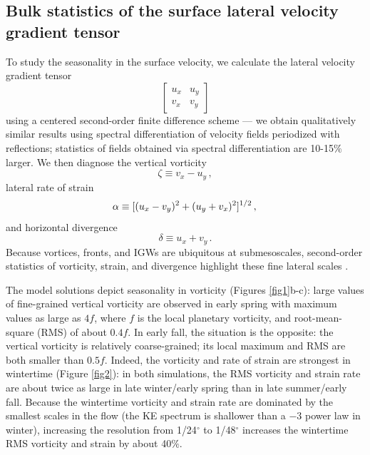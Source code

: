 \documentclass[grl]{agutex2015}
\begin{document}
\begin{article}
\section{Bulk statistics of the surface lateral velocity gradient tensor}
To study the seasonality in the surface velocity, we calculate the lateral velocity gradient tensor
\begin{equation}
\left[\begin{matrix} u_x & u_y\\ v_x&v_y \end{matrix}\right]
\end{equation}
using a centered
second-order finite difference scheme --- we obtain qualitatively similar results
using spectral differentiation of velocity fields periodized with reflections;
statistics of fields obtained via spectral differentiation are 10-15$\%$ larger.
We then diagnose
the vertical vorticity
\begin{equation}
\zeta \equiv v_x - u_y\, ,
\end{equation}
lateral rate of strain
\begin{equation}
  \alpha \equiv [(u_x-v_y)^2 + (u_y + v_x)^2]^{1/2}\,,\\
\end{equation}
and horizontal divergence
\begin{equation}
\delta \equiv u_x + v_y\, .
\end{equation}
Because vortices, fronts, and IGWs are ubiquitous at submesoscales, second-order
statistics of vorticity, strain, and divergence highlight these
fine lateral scales \citep[e.g.,][]{shcherbina_etal2013}.

The model solutions depict seasonality in vorticity (Figures \ref{fig1}b-c): large values of
fine-grained vertical vorticity are observed in early spring with maximum
values as large as $4f$, where $f$ is
the local planetary vorticity, and root-mean-square (RMS) of about $0.4f$. In early
fall, the situation is the opposite: the vertical vorticity is relatively coarse-grained;
its local maximum and RMS are both smaller than $0.5f$.
Indeed, the vorticity and rate of strain are strongest in wintertime (Figure \ref{fig2}):
in both simulations, the RMS vorticity and strain rate are about twice as large in
late winter/early spring
than in late summer/early fall. Because the wintertime vorticity and strain rate
are dominated by the smallest scales in the flow (the KE spectrum is shallower than
a $-3$ power law in winter), increasing the resolution from
1/24$^\circ$ to 1/48$^\circ$ increases the wintertime RMS vorticity
and strain by about 40$\%$.


\end{article}
\end{document}
